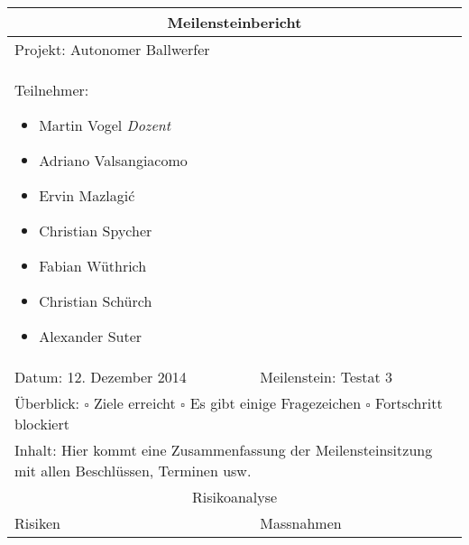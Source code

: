 \begin{table}[!h]
	\renewcommand{\arraystretch}{1.5}
	\begin{tabularx}{\linewidth}{|X|X|}
		\hline
		\multicolumn{2}{|c|}{
			\parbox[0pt][3em][c]{0cm}{}
			{\large \textbf{Meilensteinbericht}}
		} \\
		\hline
		\multicolumn{2}{|l|}{Projekt: Autonomer Ballwerfer} \\
		\hline
		\multicolumn{2}{|p{0.95\textwidth}|}{
			Teilnehmer:
			\begin{itemize}
				\setlength\itemsep{0em}
				\item Martin Vogel \textit{Dozent}
				\item Adriano Valsangiacomo
				\item Ervin Mazlagi\'c
				\item Christian Spycher
				\item Fabian Wüthrich
				\item Christian Schürch
				\item Alexander Suter
			\end{itemize}
		} \\
		\hline
		Datum: 12. Dezember 2014 & Meilenstein: Testat 3 \\
		\hline
		\multicolumn{2}{|p{0.95\textwidth}|}{
			Überblick: \newline
			$\square$ Ziele erreicht \newline 
			$\square$ Es gibt einige Fragezeichen \newline
			$\square$ Fortschritt blockiert
		} \\
		\hline
		\multicolumn{2}{|p{0.95\textwidth}|}{
			Inhalt: \newline
			Hier kommt eine Zusammenfassung der Meilensteinsitzung mit allen Beschlüssen, Terminen usw.	
		} \\
		\hline
		\multicolumn{2}{|c|}{Risikoanalyse} \\
		\hline
		Risiken & Massnahmen \\
		\hline
	\end{tabularx}
\end{table}